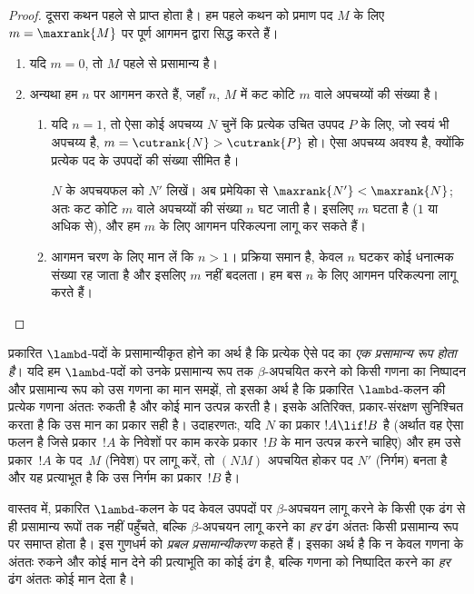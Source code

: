\documentclass[../../../include/open-logic-section]{subfiles}
\begin{document}
\begin{proof}
  दूसरा कथन पहले से प्राप्त होता है। हम पहले कथन को प्रमाण पद $M$ के लिए
  $m=\maxrank{M}$ पर पूर्ण आगमन द्वारा सिद्ध करते हैं।
  \begin{enumerate}

  \item यदि $m=0$, तो $M$ पहले से प्रसामान्य है।
  \item अन्यथा हम $n$ पर आगमन करते हैं, जहाँ $n$, $M$ में कट कोटि $m$ वाले
    अपचय्यों की संख्या है।
    \begin{enumerate}
    \item यदि $n=1$, तो ऐसा कोई अपचय्य $N$ चुनें कि प्रत्येक उचित उपपद $P$
      के लिए, जो स्वयं भी अपचय्य है, $m = \cutrank{N} > \cutrank{P}$ हो।
      ऐसा अपचय्य अवश्य है, क्योंकि प्रत्येक पद के उपपदों की संख्या सीमित है।

      $N$ के अपचयफल को $N'$ लिखें। अब प्रमेयिका से
      $\maxrank{N'} < \maxrank{N}$; अतः कट कोटि $m$ वाले अपचय्यों की संख्या
      $n$ घट जाती है। इसलिए $m$ घटता है ($1$ या अधिक से), और हम $m$ के लिए
      आगमन परिकल्पना लागू कर सकते हैं।
    \item आगमन चरण के लिए मान लें कि $n>1$। प्रक्रिया समान है, केवल $n$
      घटकर कोई धनात्मक संख्या रह जाता है और इसलिए $m$ नहीं बदलता। हम बस
      $n$ के लिए आगमन परिकल्पना लागू करते हैं।
    \end{enumerate}
\end{enumerate}
\end{proof}

प्रकारित $\lambd$-पदों के प्रसामान्यीकृत होने का अर्थ है कि प्रत्येक ऐसे
पद का \emph{एक प्रसामान्य रूप होता है}। यदि हम $\lambd$-पदों को उनके
प्रसामान्य रूप तक $\beta$-अपचयित करने को किसी गणना का निष्पादन और प्रसामान्य
रूप को उस गणना का मान समझें, तो इसका अर्थ है कि प्रकारित $\lambd$-कलन की
प्रत्येक गणना अंततः रुकती है और कोई मान उत्पन्न करती है। इसके अतिरिक्त,
प्रकार-संरक्षण सुनिश्चित करता है कि उस मान का प्रकार सही है। उदाहरणतः, यदि
$N$ का प्रकार $!A \lif !B$ है (अर्थात वह ऐसा फलन है जिसे प्रकार~$!A$ के
निवेशों पर काम करके प्रकार~$!B$ के मान उत्पन्न करने चाहिए) और हम उसे
प्रकार~$!A$ के पद~$M$ (निवेश) पर लागू करें, तो $(NM)$ अपचयित होकर पद $N'$
(निर्गम) बनता है और यह प्रत्याभूत है कि उस निर्गम का प्रकार~$!B$ है।

वास्तव में, प्रकारित $\lambd$-कलन के पद केवल उपपदों पर $\beta$-अपचयन लागू
करने के किसी एक ढंग से ही प्रसामान्य रूपों तक नहीं पहुँचते, बल्कि
$\beta$-अपचयन लागू करने का \emph{हर} ढंग अंततः किसी प्रसामान्य रूप पर समाप्त
होता है। इस गुणधर्म को \emph{प्रबल प्रसामान्यीकरण} कहते हैं। इसका अर्थ है कि
न केवल गणना के अंततः रुकने और कोई मान देने की प्रत्याभूति का कोई ढंग है,
बल्कि गणना को निष्पादित करने का \emph{हर} ढंग अंततः कोई मान देता है।
\end{document}
